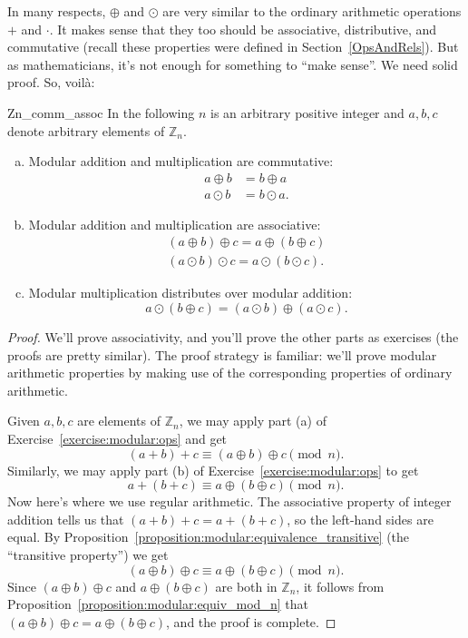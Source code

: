In many respects, $\oplus$ and $\odot$ are very similar to the ordinary arithmetic operations $+$ and $\cdot$. It makes sense that they too should be associative, distributive, and commutative  (recall these properties were defined   in Section~\ref{OpsAndRels}). But as mathematicians, it's not enough for something to ``make sense''. We need solid proof. So, voil\`a:

\begin{prop}{Zn_comm_assoc}
In the following $n$ is an arbitrary positive integer and $a, b, c$ denote arbitrary elements of ${\mathbb Z}_n$.
\begin{enumerate}[(a)]
 
\item \label{comm}  %
Modular addition and multiplication are commutative:  
\begin{align*}
a \oplus b  & =  b \oplus a  \\
a \odot b   & =  b \odot a .
\end{align*}
 
\item \label{assoc}  %
Modular addition and multiplication are associative: 
\begin{align*}
(a \oplus b) \oplus c  =  a \oplus (b \oplus c) \\
(a \odot b) \odot c    =  a \odot (b \odot c).
\end{align*}
 
\item \label{distrib}  %
Modular multiplication distributes over modular addition: 
\[
a \odot (b \oplus c)  = (a \odot b)\oplus (a \odot c).
\]
\end{enumerate}
\end{prop}

\begin{proof}
We'll prove associativity, and  you'll prove the other parts as exercises (the proofs are pretty similar). The proof strategy is familiar: we'll prove modular arithmetic properties by making use of the corresponding properties of ordinary arithmetic.

Given $a,b,c$ are elements of $\mathbb{Z}_n$, 
we may apply part (a) of Exercise~\ref{exercise:modular:ops} and get
\[ (a + b) + c  \equiv  (a \oplus b) \oplus c \pmod{n}. \]
Similarly, we may apply part  (b) of Exercise~\ref{exercise:modular:ops} to get
\[ a + (b + c)  \equiv  a \oplus (b \oplus c) \pmod{n}. \]
Now here's where we use regular arithmetic. The associative property of integer addition tells us that $(a+b)+c = a + (b + c) $, so the left-hand sides are equal. 
By 
Proposition~\ref{proposition:modular:equivalence_transitive} (the ``transitive property'') we get
\[ (a \oplus b) \oplus c  \equiv  a \oplus (b \oplus c) \pmod{n}. \]
Since  $(a \oplus b) \oplus c$  and  $a \oplus (b \oplus c)$ are both in ${\mathbb{Z}}_n$, it follows from Proposition~\ref{proposition:modular:equiv_mod_n} that  
$(a \oplus b) \oplus c = a \oplus (b \oplus c)$, and the proof is complete. 
\end{proof}
 
